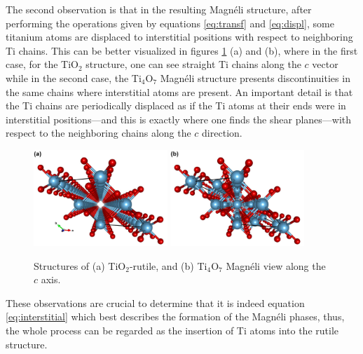 The second observation is that in the resulting Magnéli structure, after performing the operations given by equations \ref{eq:transf} and \ref{eq:displ}, some titanium atoms are displaced to interstitial positions with respect to neighboring Ti chains. This can be better visualized in figures \ref{fig:structures-c-prl} (a) and (b), where in the first case, for the TiO$_2$ structure, one can see straight Ti chains along the $c$ vector while in the second case, the Ti$_4$O$_7$ Magnéli structure presents discontinuities in the same chains where interstitial atoms are present. An important detail is that the Ti chains are periodically displaced as if the Ti atoms at their ends were in interstitial positions---and this is exactly where one finds the shear planes---with respect to the neighboring chains along the $c$ direction.
\begin{center}
 \begin{figure}[ht!]
  \begin{center}
   \includegraphics[width=0.45\textwidth]{img/TiO2-c-prl.jpg}
   \includegraphics[width=0.45\textwidth]{img/Ti4O7-c-prl.jpg}
   \caption{Structures of (a) TiO$_2$-rutile, and (b) Ti$_4$O$_7$ Magnéli view along the $c$ axis.}
   \label{fig:structures-c-prl} 
  \end{center}
 \end{figure}
\end{center}

These observations are crucial to determine that it is indeed equation \ref{eq:interstitial} which best describes the formation of the Magnéli phases, thus, the whole process can be regarded as the insertion of Ti atoms into the rutile structure.

